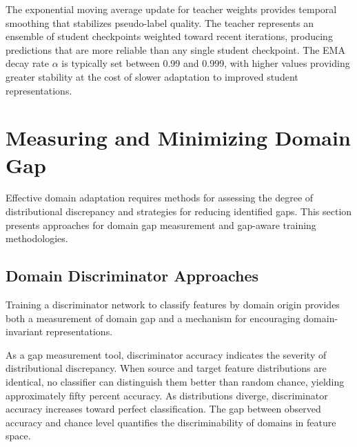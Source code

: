 The exponential moving average update for teacher weights provides temporal smoothing that stabilizes pseudo-label quality. The teacher represents an ensemble of student checkpoints weighted toward recent iterations, producing predictions that are more reliable than any single student checkpoint. The EMA decay rate $\alpha$ is typically set between 0.99 and 0.999, with higher values providing greater stability at the cost of slower adaptation to improved student representations.

\section{Measuring and Minimizing Domain Gap}
\label{sec:measuring_gap}

Effective domain adaptation requires methods for assessing the degree of distributional discrepancy and strategies for reducing identified gaps. This section presents approaches for domain gap measurement and gap-aware training methodologies.

\subsection{Domain Discriminator Approaches}

Training a discriminator network to classify features by domain origin provides both a measurement of domain gap and a mechanism for encouraging domain-invariant representations.

As a gap measurement tool, discriminator accuracy indicates the severity of distributional discrepancy. When source and target feature distributions are identical, no classifier can distinguish them better than random chance, yielding approximately fifty percent accuracy. As distributions diverge, discriminator accuracy increases toward perfect classification. The gap between observed accuracy and chance level quantifies the discriminability of domains in feature space.


